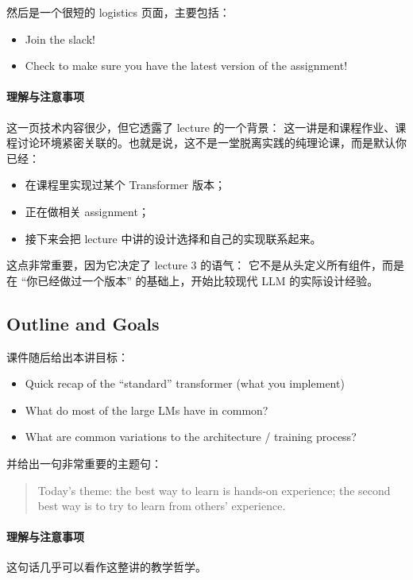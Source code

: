 \documentclass[a4paper,UTF8]{article}
\numberwithin{equation}{section}
\begin{document}
然后是一个很短的 logistics 页面，主要包括：
\begin{itemize}
    \item Join the slack!
    \item Check to make sure you have the latest version of the assignment!
\end{itemize}

\paragraph{理解与注意事项}
这一页技术内容很少，但它透露了 lecture 的一个背景：  
这一讲是和课程作业、课程讨论环境紧密关联的。也就是说，这不是一堂脱离实践的纯理论课，而是默认你已经：
\begin{itemize}
    \item 在课程里实现过某个 Transformer 版本；
    \item 正在做相关 assignment；
    \item 接下来会把 lecture 中讲的设计选择和自己的实现联系起来。
\end{itemize}

这点非常重要，因为它决定了 lecture 3 的语气：  
它不是从头定义所有组件，而是在 ``你已经做过一个版本'' 的基础上，开始比较现代 LLM 的实际设计经验。

\subsection{Outline and Goals}

课件随后给出本讲目标：
\begin{itemize}
    \item Quick recap of the ``standard'' transformer (what you implement)
    \item What do most of the large LMs have in common?
    \item What are common variations to the architecture / training process?
\end{itemize}

并给出一句非常重要的主题句：
\begin{quote}
Today’s theme: the best way to learn is hands-on experience; the second best way is to try to learn from others’ experience.
\end{quote}

\paragraph{理解与注意事项}
这句话几乎可以看作这整讲的教学哲学。
\end{document}
